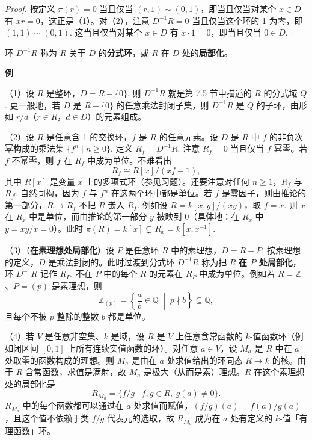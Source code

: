 \begin{proof}
按定义 \(\pi(r) = 0\) 当且仅当 \((r,1) \sim (0,1)\)，即当且仅当对某个 \(x \in D\) 有 \(xr = 0\)，这正是（1）。对（2），注意 \(D^{-1}R = 0\) 当且仅当这个环的 1 为零，即 \((1,1) \sim (0,1)\). 这当且仅当对某个 \(x \in D\) 有 \(x\cdot1 = 0\)，即当且仅当 \(0 \in D\).
\end{proof}

\begin{definition}
环 \(D^{-1}R\) 称为 \(R\) 关于 \(D\) 的\textbf{分式环}，或 \(R\) 在 \(D\) 处的\textbf{局部化}。
\end{definition}

\noindent\textbf{例}

（1）设 \(R\) 是整环，\(D = R-\{0\}\). 则 \(D^{-1}R\) 就是第 7.5 节中描述的 \(R\) 的分式域 \(Q\). 更一般地，若 \(D\) 是 \(R-\{0\}\) 的任意乘法封闭子集，则 \(D^{-1}R\) 是 \(Q\) 的子环，由形如 \(r/d\)（\(r \in R\)，\(d \in D\)）的元素组成。

（2）设 \(R\) 是任意含 1 的交换环，\(f\) 是 \(R\) 的任意元素。设 \(D\) 是 \(R\) 中 \(f\) 的非负次幂构成的乘法集 \(\{f^n \mid n \geq 0\}\). 定义 \(R_f = D^{-1}R\). 注意 \(R_f = 0\) 当且仅当 \(f\) 幂零。若 \(f\) 不幂零，则 \(f\) 在 \(R_f\) 中成为单位。不难看出
\[
R_f \cong R[x]/(xf-1),
\]
其中 \(R[x]\) 是变量 \(x\) 上的多项式环（参见习题）。还要注意对任何 \(n \geq 1\)，\(R_f\) 与 \(R_{f^n}\) 自然同构，因为 \(f\) 与 \(f^n\) 在这两个环中都是单位。若 \(f\) 是零因子，则由推论的第一部分，\(R \to R_f\) 不把 \(R\) 嵌入 \(R_f\). 例如设 \(R = k[x,y]/(xy)\)，取 \(f = x\). 则 \(x\) 在 \(R_x\) 中是单位，而由推论的第一部分 \(y\) 被映到 0（具体地：在 \(R_x\) 中 \(y = xy/x = 0\)）。此时 \(\pi(R) = k[x] \subsetneq R_x = k[x, x^{-1}]\).

（3）（\textbf{在素理想处局部化}）设 \(P\) 是任意环 \(R\) 中的素理想，\(D = R-P\). 按素理想的定义，\(D\) 是乘法封闭的。此时过渡到分式环 \(D^{-1}R\) 称为把 \(R\) \textbf{在 \(P\) 处局部化}，环 \(D^{-1}R\) 记作 \(R_P\). 不在 \(P\) 中的每个 \(R\) 的元素在 \(R_P\) 中成为单位。例如若 \(R = \mathbb{Z}\)、\(P = (p)\) 是素理想，则
\[
\mathbb{Z}_{(p)} = \left\{\frac{a}{b} \in \mathbb{Q} \;\middle|\; p \nmid b\right\} \subseteq \mathbb{Q},
\]
且每个不被 \(p\) 整除的整数 \(b\) 都是单位。

（4）若 \(V\) 是任意非空集、\(k\) 是域，设 \(R\) 是 \(V\) 上任意含常函数的 \(k\)-值函数环（例如闭区间 \([0,1]\) 上所有连续实值函数的环）。对任意 \(a \in V\)，设 \(M_a\) 是 \(R\) 中在 \(a\) 处取零的函数构成的理想。则 \(M_a\) 是由在 \(a\) 处求值给出的环同态 \(R \to k\) 的核。由于 \(R\) 含常函数，求值是满射，故 \(M_a\) 是极大（从而是素）理想。\(R\) 在这个素理想处的局部化是
\[
R_{M_a} = \{f/g \mid f, g \in R,\ g(a) \neq 0\}.
\]
\(R_{M_a}\) 中的每个函数都可以通过在 \(a\) 处求值而赋值，\((f/g)(a) = f(a)/g(a)\)，且这个值不依赖于类 \(f/g\) 代表元的选取，故 \(R_{M_a}\) 成为在 \(a\) 处有定义的 \(k\)-值「有理函数」环。

